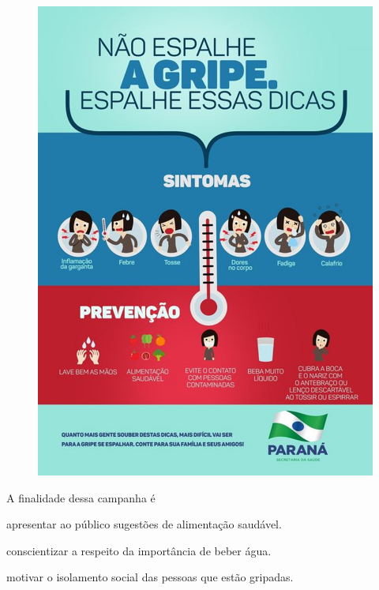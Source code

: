 \begin{conteudo}
\begin{conteudo}
\begin{conteudo}
\begin{conteudo}

\begin{figure}[htpb!]
\centering
\includegraphics[width=.7\textwidth]{media/image19.png}
\end{figure}

A finalidade dessa campanha é


\begin{escolha}
\item apresentar ao público sugestões de alimentação saudável.

\item conscientizar a respeito da importância de beber água.

\item motivar o isolamento social das pessoas que estão gripadas.


\end{escolha}
\end{conteudo}
\end{conteudo}
\end{conteudo}
\end{conteudo}
